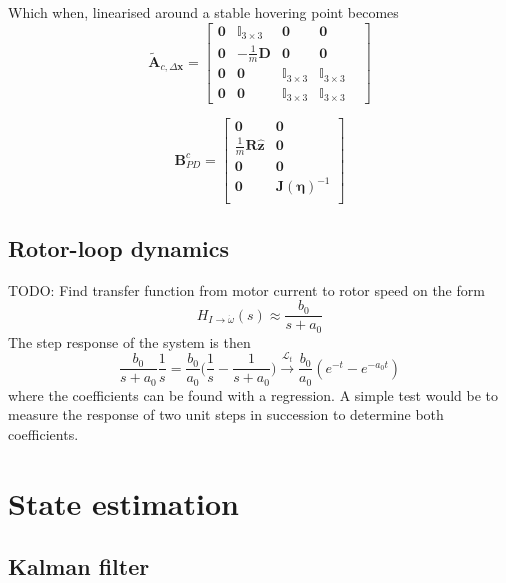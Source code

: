 \documentclass{article}
\begin{document}
Which when, linearised around a stable hovering point becomes
\begin{equation}
\tilde{\mathbf{A}}_{c,\Delta\mathbf{x}}=\begin{bmatrix}
\mathbf{0} & \mathbb{I}_{3\times 3} & \mathbf{0} & \mathbf{0} \\
\mathbf{0} & -\frac{1}{m}\mathbf{D} & \mathbf{0} & \mathbf{0} \\
\mathbf{0} & \mathbf{0} & \mathbb{I}_{3\times 3} &\mathbb{I}_{3\times 3} & \\
\mathbf{0} & \mathbf{0} & \mathbb{I}_{3\times 3} & \mathbb{I}_{3\times 3}
\end{bmatrix}
\end{equation}

\begin{equation}
\mathbf{B}^c_{PD}=\begin{bmatrix}
\mathbf{0} &\mathbf{0}\\
\frac{1}{m}\mathbf{R}\hat{\mathbf{z}} & \mathbf{0}\\
\mathbf{0} &\mathbf{0}\\
\mathbf{0} & \mathbf{J}(\boldsymbol{\eta})^{-1}\\
\end{bmatrix}
\end{equation}

\subsection{Rotor-loop dynamics}
TODO: Find transfer function from motor current to rotor speed on the form
\begin{equation}
H_{I\rightarrow \dot{\omega}}(s) \approx \frac{b_0}{s + a_0}
\end{equation}
The step response of the system is then
\begin{equation}
\frac{b_0}{s + a_0} \frac{1}{s} = \frac{b_0}{a_0}\Big(\frac{1}{s} - \frac{1}{s + a_0}\Big) \overset{\mathcal{L}_t}{\longrightarrow}
\frac{b_0}{a_0}(e^{-t} - e^{-a_0t})
\end{equation}
where the coefficients can be found with a regression. A simple test would be to measure the response of two unit steps in succession to determine both coefficients. 

\section{State estimation}
\subsection{Kalman filter}
\end{document}
